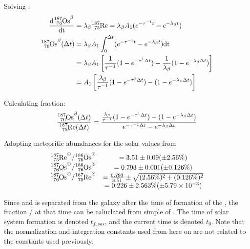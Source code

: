 Solving :
\begin{align*}
  \d{\os{187}^\beta} &= \lambda_\beta \re{187} = \lambda_\beta A_1 (e^{-\tau^{-1}t} - e^{-\lambda_\beta t}) \\
  \os{187}^\beta(\Delta t) &= \lambda_\beta A_1 \int_0^{\Delta t} (e^{-\tau^{-1}t} - e^{-\lambda_\beta t}) \textrm{dt} \\
  &= \lambda_\beta A_1 \left[ \frac{1}{\tau^{-1}} (1-e^{-\tau^{1}\Delta t}) - \frac{1}{\lambda_\beta} (1-e^{-\lambda_\beta \Delta t}) \right] \\
  &= A_1 \left[ \frac{\lambda_\beta}{\tau^{-1}} (1-e^{-\tau^{1}\Delta t}) - (1-e^{-\lambda_\beta \Delta t}) \right] \\
\end{align*}

Calculating fraction:
\begin{equation}
  \label{eq:luck-fraction}
  \frac{\os{187}^\beta(\Delta t)}{\re{187}(\Delta t)} = \frac{\frac{\lambda_\beta}{\tau^{-1}} (1-e^{-\tau^{1}\Delta t}) - (1-e^{-\lambda_\beta \Delta t})}{e^{-\tau^{-1} \Delta t} - e^{-\lambda_\beta \Delta t}}
\end{equation}

Adopting meteoritic abundances for the solar values  from 
\begin{equation}
  \label{eq:shizuma-frac}
  \begin{array}{cc}
    \re{187}^\odot/\os{186}^\odot &= 3.51 \pm 0.09 (\pm 2.56\%) \\
    \os{187}^\odot/\os{186}^\odot &= 0.793 \pm 0.001 (\pm 0.126\%) \\
    \os{187}^\odot/\re{187}^\odot &= \frac{0.793}{3.51} \pm \sqrt{(2.56\%)^2 + (0.126\%)^2} \\
    &= 0.226 \pm 2.563\% (\pm 5.79\times 10^{-3})
  \end{array}
\end{equation}

Since  and  is separated from the galaxy after the time of formation of the \sos,
the fraction / at that time can be caluclated from simple \betadecay of .
The time of solar system formation is denoted $t_{f,sos}$, and the current time is denoted $t_0$.
Note that the normalization and integration constants used from here on are not related to the constants used previously.

